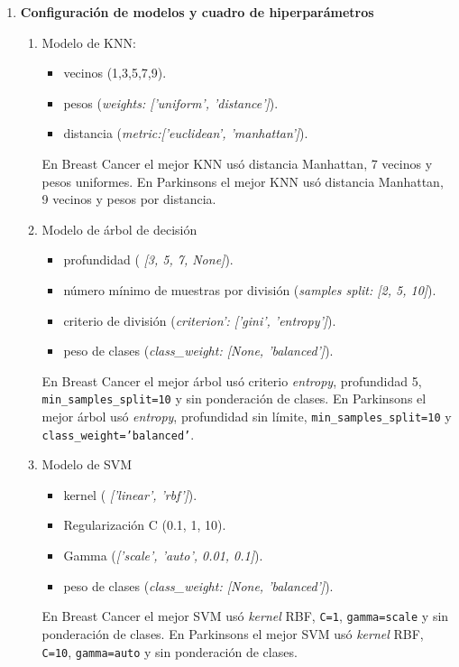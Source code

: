 \documentclass{article}
\begin{document}
\begin{enumerate}
  \item \textbf{Configuración de modelos y cuadro de hiperparámetros}
    \begin{enumerate}
      \item Modelo de KNN:
      \begin{itemize}
          \item vecinos (1,3,5,7,9).
          \item pesos (\textit{weights: ['uniform', 'distance']}).
          \item distancia (\textit{metric:['euclidean', 'manhattan']}).
      \end{itemize}

      En Breast Cancer el mejor KNN usó distancia Manhattan, 7 vecinos y pesos uniformes. En Parkinsons el mejor KNN usó distancia Manhattan, 9 vecinos y pesos por distancia.

      \item Modelo de árbol de decisión
      \begin{itemize}
          \item profundidad ( \textit{[3, 5, 7, None]}).
          \item número mínimo de muestras por división (\textit{samples split: [2, 5, 10]}).
          \item criterio de división (\textit{criterion': ['gini', 'entropy']}).
          \item peso de clases (\textit{class\_weight: [None, 'balanced']}).
      \end{itemize}

      En Breast Cancer el mejor árbol usó criterio \textit{entropy}, profundidad 5, \texttt{min\_samples\_split=10} y sin ponderación de clases. En Parkinsons el mejor árbol usó \textit{entropy}, profundidad sin límite, \texttt{min\_samples\_split=10} y \texttt{class\_weight='balanced'}.

      \item Modelo de SVM
      \begin{itemize}
          \item kernel ( \textit{['linear', 'rbf']}).
          \item Regularización C (0.1, 1, 10).
          \item Gamma (\textit{['scale', 'auto', 0.01, 0.1]}).
          \item peso de clases (\textit{class\_weight: [None, 'balanced']}).
      \end{itemize}

      En Breast Cancer el mejor SVM usó \textit{kernel} RBF, \texttt{C=1}, \texttt{gamma=scale} y sin ponderación de clases. En Parkinsons el mejor SVM usó \textit{kernel} RBF, \texttt{C=10}, \texttt{gamma=auto} y sin ponderación de clases.
    \end{enumerate}


\end{enumerate}
\end{document}
